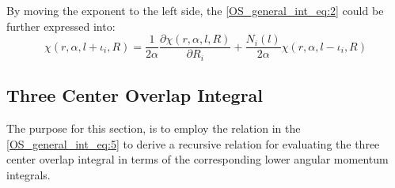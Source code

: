 By moving the exponent to the left side, the \ref{OS_general_int_eq:2}
could be further expressed into:
\begin{equation}
 \label{OS_general_int_eq:5}
\chi(r,\alpha,l+\iota_{i},R) =  
\frac{1}{2\alpha}\frac{\partial \chi(r,\alpha,l,R)}{\partial R_{i}}
+ \frac{N_{i}(l)}{2\alpha}\chi(r,\alpha,l-\iota_{i},R)
\end{equation} 

\subsection{Three Center Overlap Integral}
%
%
%
The purpose for this section, is to employ the relation in the \ref{OS_general_int_eq:5}
to derive a recursive relation for evaluating the three center overlap integral
in terms of the corresponding lower angular momentum integrals. 

